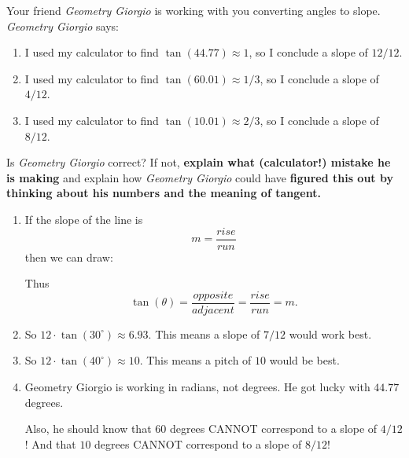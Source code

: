 \documentclass[noauthor,nooutcomes,hints,handout,12pt]{ximera}
\begin{document}
\begin{question}
 Your friend \textit{Geometry Giorgio} is working with you converting
 angles to slope.  \textit{Geometry Giorgio} says:
        \begin{enumerate}
        \item I used my calculator to find $\tan(44.77) \approx 1$, so I conclude a slope of $12/12$.
        \item I used my calculator to find $\tan(60.01) \approx 1/3$, so I conclude a slope of $4/12$.
        \item I used my calculator to find $\tan(10.01) \approx 2/3$, so I conclude a slope of $8/12$.
        \end{enumerate}
  Is \textit{Geometry Giorgio} correct? If not, \textbf{explain what (calculator!) mistake
    he is making} and explain how \textit{Geometry Giorgio} could have
  \textbf{figured this out by thinking about his numbers and the meaning of tangent.}
\begin{freeResponse}
  \begin{enumerate}
  \item If the slope of the line is
    \[
    m = \frac{rise}{run}
    \]
    then we can draw:
    \begin{center}
    \end{center}
    Thus
    \[
    \tan(\theta) =\frac{opposite}{adjacent} = \frac{rise}{run} = m.
    \]
  \item So $12\cdot \tan(30^\circ) \approx 6.93$. This means a slope
    of $7/12$ would work best.

  \item So $12\cdot \tan(40^\circ)\approx 10$. This means a pitch of
    $10$ would be best.
  \item Geometry Giorgio is working in radians, not degrees.
    He got lucky with $44.77$ degrees.

    Also, he should know that $60$ degrees CANNOT correspond to a
    slope of $4/12$! And  that $10$ degrees CANNOT correspond to a
    slope of $8/12$!
  \end{enumerate}
  \end{freeResponse}
\end{question}
\end{document}
